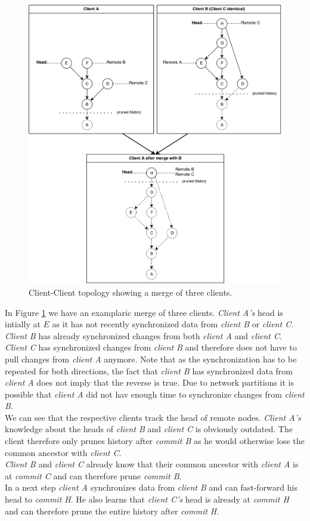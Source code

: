 \begin{figure}[H]
  \centering
  \includegraphics[width=1.0\textwidth]{img/client-client}
  \caption{Client-Client topology showing a merge of three clients.}
  \label{fig:histo.topologies.client-client}
\end{figure}

In Figure \ref{fig:histo.topologies.client-client} we have an examplaric merge of three clients.
\emph{Client A's} head is intially at $ E $ as it has not recently synchronized data from \emph{client B} or \emph{client C}.
\emph{Client B} has already synchronized changes from both \emph{client A} and \emph{client C}.
\emph{Client C} has synchronized changes from \emph{client B} and therefore does not have to pull changes from \emph{client A} anymore.
Note that as the synchronization has to be repeated for both directions, the fact that \emph{client B} has synchronized data from \emph{client A} does not imply that the reverse is true.
Due to network partitions it is possible that \emph{client A} did not hav enough time to synchronize changes from \emph{client B}.\\
We can see that the respective clients track the head of remote nodes.
\emph{Client A's} knowledge about the heads of \emph{client B} and \emph{client C} is obviously outdated.
The client therefore only prunes history after \emph{commit B} as he would otherwise lose the common ancestor with \emph{client C}.\\
\emph{Client B} and \emph{client C} already know that their common ancestor with \emph{client A} is at \emph{commit C} and can therefore prune \emph{commit B}.\\
In a next step \emph{client A} synchronizes data from \emph{client B} and can fast-forward his head to \emph{commit H}.
He also learns that \emph{client C's} head is already at \emph{commit H} and can therefore prune the entire history after \emph{commit H}.

